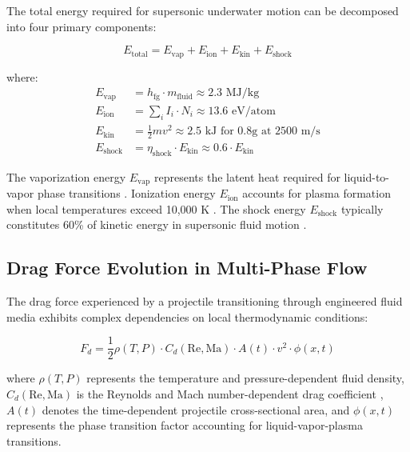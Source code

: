 \documentclass[12pt,a4paper]{article}
\begin{document}
The total energy required for supersonic underwater motion can be decomposed into four primary components:

\begin{equation}
E_{\text{total}} = E_{\text{vap}} + E_{\text{ion}} + E_{\text{kin}} + E_{\text{shock}}
\label{eq:total_energy}
\end{equation}

where:
\begin{align}
E_{\text{vap}} &= h_{\text{fg}} \cdot m_{\text{fluid}} \approx 2.3 \text{ MJ/kg} \label{eq:vaporization}\\
E_{\text{ion}} &= \sum_{i} I_i \cdot N_i \approx 13.6 \text{ eV/atom} \label{eq:ionization}\\
E_{\text{kin}} &= \frac{1}{2}mv^2 \approx 2.5 \text{ kJ for 0.8g at 2500 m/s} \label{eq:kinetic}\\
E_{\text{shock}} &= \eta_{\text{shock}} \cdot E_{\text{kin}} \approx 0.6 \cdot E_{\text{kin}} \label{eq:shock}
\end{align}

The vaporization energy $E_{\text{vap}}$ represents the latent heat required for liquid-to-vapor phase transitions \cite{cengel2019thermodynamics}. Ionization energy $E_{\text{ion}}$ accounts for plasma formation when local temperatures exceed 10,000 K \cite{chen2016introduction}. The shock energy $E_{\text{shock}}$ typically constitutes 60\% of kinetic energy in supersonic fluid motion \cite{sedov1993similarity}.

\subsection{Drag Force Evolution in Multi-Phase Flow}

The drag force experienced by a projectile transitioning through engineered fluid media exhibits complex dependencies on local thermodynamic conditions:

\begin{equation}
F_d = \frac{1}{2}\rho(T,P) \cdot C_d(\text{Re},\text{Ma}) \cdot A(t) \cdot v^2 \cdot \phi(x,t)
\label{eq:drag_force}
\end{equation}

where $\rho(T,P)$ represents the temperature and pressure-dependent fluid density, $C_d(\text{Re},\text{Ma})$ is the Reynolds and Mach number-dependent drag coefficient \cite{schlichting2016boundary}, $A(t)$ denotes the time-dependent projectile cross-sectional area, and $\phi(x,t)$ represents the phase transition factor accounting for liquid-vapor-plasma transitions.
\end{document}
